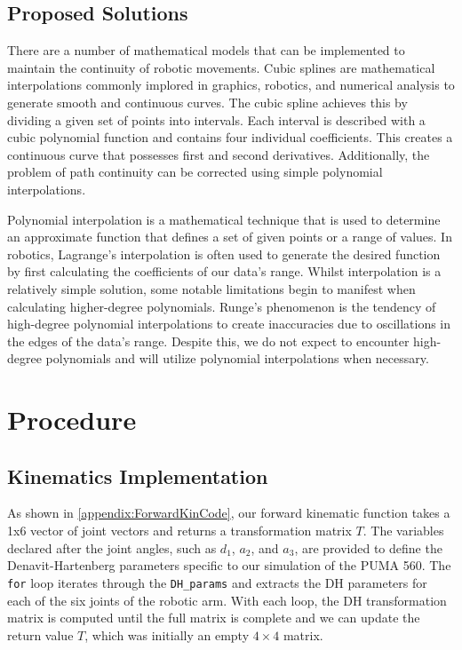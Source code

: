 \documentclass[conference]{IEEEtran}
\begin{document}
\subsection{Proposed Solutions}
There are a number of mathematical models that can be implemented to maintain the continuity of robotic movements. Cubic splines are mathematical interpolations commonly implored in graphics, robotics, and numerical analysis to generate smooth and continuous curves. The cubic spline achieves this by dividing a given set of points into intervals. Each interval is described with a cubic polynomial function and contains four individual coefficients. This creates a continuous curve that possesses first and second derivatives. Additionally, the problem of path continuity can be corrected using simple polynomial interpolations. 

Polynomial interpolation is a mathematical technique that is used to determine an approximate function that defines a set of given points or a range of values. In robotics, Lagrange’s interpolation is often used to generate the desired function by first calculating the coefficients of our data’s range. Whilst interpolation is a relatively simple solution, some notable limitations begin to manifest when calculating higher-degree polynomials. Runge’s phenomenon is the tendency of high-degree polynomial interpolations to create inaccuracies due to oscillations in the edges of the data’s range. Despite this, we do not expect to encounter high-degree polynomials and will utilize polynomial interpolations when necessary. 

\section{Procedure}
\subsection{Kinematics Implementation}

As shown in \ref{appendix:ForwardKinCode}, our forward kinematic function takes a 1x6 vector of joint vectors and returns a transformation matrix $T$. The variables declared after the joint angles, such as $d_1$, $a_2$, and $a_3$, are provided to define the Denavit-Hartenberg parameters specific to our simulation of the PUMA 560. The \texttt{for} loop iterates through the \texttt{DH\_params} and extracts the DH parameters for each of the six joints of the robotic arm. With each loop, the DH transformation matrix is computed until the full matrix is complete and we can update the return value $T$, which was initially an empty $4 \times 4$ matrix.
\end{document}
